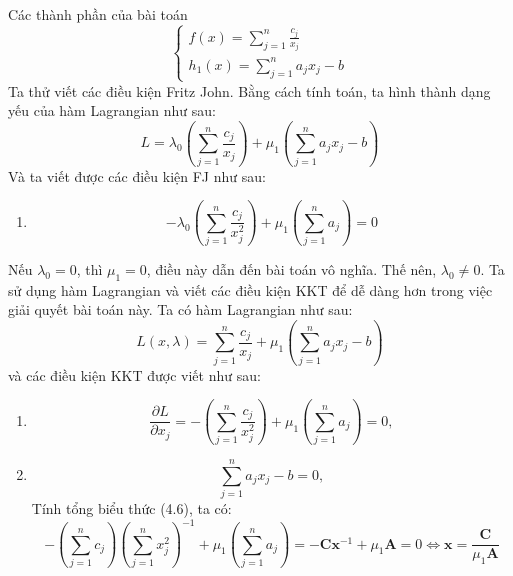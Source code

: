 \begin{solution}

    Các thành phần của bài toán
    \begin{equation}
        \begin{cases}
            f(x) = \sum_{j=1}^n\frac{c_j}{x_j} \\
            h_1(x) = \sum_{j=1}^na_jx_j - b
        \end{cases}
    \end{equation}
    Ta thử viết các điều kiện Fritz John. Bằng cách tính toán, ta hình thành dạng yếu của hàm Lagrangian như sau:
    \begin{equation}
        L = \lambda_0\left(\sum_{j=1}^n\frac{c_j}{x_j}\right) + \mu_1\left(\sum_{j=1}^na_jx_j - b\right)
    \end{equation}
    Và ta viết được các điều kiện FJ như sau:
    \begin{enumerate}[label=(\alph*)]
        \item \begin{equation}
            -\lambda_0\left(\sum_{j=1}^n\frac{c_j}{x^2_j}\right) + \mu_1\left(\sum_{j=1}^na_j\right) = 0
        \end{equation}
    \end{enumerate}
    Nếu $\lambda_0 = 0$, thì $\mu_1 = 0$, điều này dẫn đến bài toán vô nghĩa. Thế nên, $\lambda_0 \ne 0$. Ta sử dụng hàm Lagrangian và viết các điều kiện KKT để dễ dàng hơn trong việc giải quyết bài toán này. Ta có hàm Lagrangian như sau:
    \begin{equation}
        L(x, \lambda) = \sum_{j=1}^n\frac{c_j}{x_j} + \mu_1\left(\sum_{j=1}^na_jx_j - b\right)
    \end{equation}
    và các điều kiện KKT được viết như sau:
    \begin{enumerate}[label=(\alph*)]
        \item \begin{equation}
            \dfrac{\partial L}{\partial x_j} = -\left(\sum_{j=1}^n\frac{c_j}{x^2_j}\right) + \mu_1\left(\sum_{j=1}^na_j\right) = 0, 
        \end{equation}
        \item \begin{equation}
            \sum_{j=1}^na_jx_j - b = 0, 
        \end{equation}
    Tính tổng biểu thức (4.6), ta có:
    \begin{equation}
        -\left(\sum_{j=1}^nc_j\right)\left(\sum_{j=1}^nx^2_j\right)^{-1} + \mu_1\left(\sum_{j=1}^na_j\right) = -\mathbf{C}\mathbf{x}^{-1} + \mu_1\mathbf{A} = 0\Leftrightarrow \mathbf{x} = \dfrac{\mathbf{C}}{\mu_1\mathbf{A}}

\end{equation}
\end{enumerate}
\end{solution}

